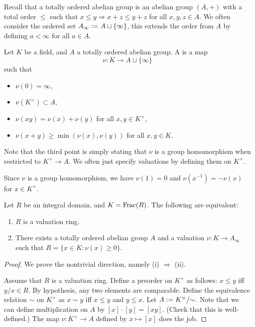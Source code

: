 \documentclass[12pt]{article}
\begin{document}
Recall that a totally ordered abelian group is an abelian group $(A, +)$ with a total order $\le$ such that $x \le y \Rightarrow x + z \le y + z$ for all $x, y, z \in A$. \newline
We often consider the ordered set $A_{\infty} \vcentcolon= A \sqcup \{\infty\}$, this extends the order from $A$ by defining $a < \infty$ for all $a \in A$.

\begin{defn}
	Let $K$ be a field, and $A$ a totally ordered abelian group. A  is a map
	\begin{equation*} 
		\nu : K \to A \sqcup \{\infty\}
	\end{equation*}
	such that
	\begin{itemize}
		\item $\nu(0) = \infty$,
		\item $\nu(K^{\times}) \subset A$,
		\item $\nu(xy) = \nu(x) + \nu(y)$ for all $x, y \in K^{\times}$,
		\item $\nu(x + y) \ge \min(\nu(x), \nu(y))$ for all $x, y \in K$.
	\end{itemize}
\end{defn}
Note that the third point is simply stating that $\nu$ is a group homomorphism when restricted to $K^{\times} \to A$. We often just specify valuations by defining them on $K^{\times}$.

\begin{obs}
	Since $\nu$ is a group homomorphism, we have $\nu(1) = 0$ and $\nu(x^{-1}) = -\nu(x)$ for $x \in K^{\times}$.
\end{obs}

\begin{prop}
	Let $R$ be an integral domain, and $K = \operatorname{Frac}(R)$. The following are equivalent:
	\begin{enumerate}[label=(\roman*)]
		\item $R$ is a valuation ring.
		\item There exists a totally ordered abelian group $A$ and a valuation $\nu : K \to A_{\infty}$ such that $R = \{x \in K : \nu(x) \ge 0\}$.
	\end{enumerate}
\end{prop}
\begin{proof} 
	We prove the nontrivial direction, namely (i) $\Rightarrow$ (ii).

	Assume that $R$ is a valuation ring. Define a preorder on $K^{\times}$ as follows: $x \le y$ iff $y/x \in R$. By hypothesis, any two elements are comparable. \newline
	Define the equivalence relation $\sim$ on $K^{\times}$ as $x \sim y$ iff $x \le y$ and $y \le x$. \newline
	Let $A \vcentcolon= K^{\times}/{\sim}$. Note that we can define multiplication on $A$ by $[x] \cdot [y] = [xy]$. (Check that this is well-defined.) \newline
	The map $\nu : K^{\times} \to A$ defined by $x \mapsto [x]$ does the job. 
\end{proof}
\end{document}
